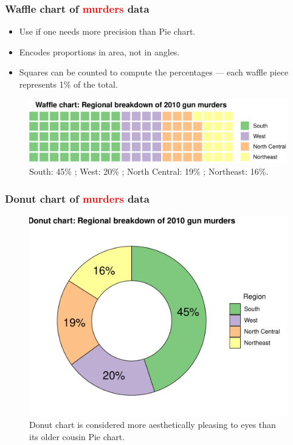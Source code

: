 \documentclass{beamer}
\begin{document}
\begin{frame}[t]\frametitle{Waffle chart of \textcolor{red}{murders} data}
\small
\begin{itemize}
\item Use if one needs more precision than Pie chart.
\item Encodes proportions in area, not in angles.
\item Squares can be counted to compute the percentages --- each waffle piece represents 1\% of the total.
\end{itemize}
\begin{figure}
\includegraphics[width=0.99\linewidth]{PlotsLec1/WaffleMurders2}
\caption{South: 45\% ; West: 20\% ;  North Central: 19\% ; Northeast: 16\%.}
\end{figure}
\end{frame}


\begin{frame}[t]\frametitle{Donut chart of \textcolor{red}{murders} data}

\begin{figure}
\includegraphics[width=0.80\linewidth]{PlotsLec1/DonutMurders}
\caption{Donut chart is considered more aesthetically pleasing to eyes than its older cousin Pie chart.}
\end{figure}
\end{frame}
\end{document}
